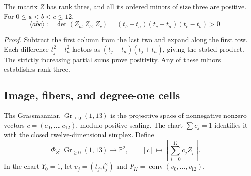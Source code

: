 \begin{proposition}
\label{prop:polygon-vandermonde}
The matrix \(Z\) has rank three, and all its ordered minors of size
three are positive. For \(0\leq a<b<c\leq12\),
\begin{equation}
 \langle abc\rangle:=\det(Z_a,Z_b,Z_c)
 =(t_b-t_a)(t_c-t_a)(t_c-t_b)>0.
 \label{eq:polygon-minors}
\end{equation}
\end{proposition}
\begin{proof}
Subtract the first column from the last two and expand along the
first row. Each difference \(t_j^2-t_a^2\) factors as
\((t_j-t_a)(t_j+t_a)\), giving the stated product. The strictly
increasing partial sums prove positivity. Any of these minors
establishes rank three.
\end{proof}

\subsection{Image, fibers, and degree-one cells}

The Grassmannian \(\operatorname{Gr}_{\geq0}(1,13)\) is the
projective space of nonnegative nonzero vectors
\(c=(c_0,\ldots,c_{12})\), modulo positive scaling.
The chart \(\sum c_j=1\) identifies it with the closed
twelve-dimensional simplex. Define
\begin{equation}
 \Phi_Z:\operatorname{Gr}_{\geq0}(1,13)\longrightarrow\mathbb P^2,
 \qquad[c]\longmapsto\left[\sum_{j=0}^{12}c_jZ_j\right].
 \label{eq:polygon-map}
\end{equation}
In the chart \(Y_0=1\), let \(v_j=(t_j,t_j^2)\) and
\(P_K=\operatorname{conv}(v_0,\ldots,v_{12})\).


